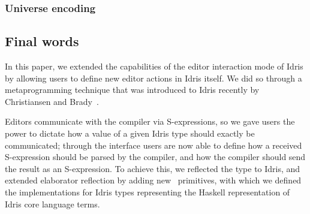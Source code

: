 



\subsubsection{Universe encoding}


\subsection{Final words}

In this paper, we extended the capabilities of the editor interaction mode of
Idris by allowing users to define new editor actions in Idris itself. We did
so through a metaprogramming technique that was introduced to Idris recently by
Christiansen and Brady~\cite{elabref}.

Editors communicate with the compiler via S-expressions, so we gave users the
power to dictate how a value of a given Idris type should exactly be
communicated; through the  interface users are now able to
define how a received S-expression should be parsed by the compiler, and how
the compiler should send the result as an S-expression. To achieve this, we
reflected the  type to Idris, and extended elaborator reflection
by adding new \Elab\ primitives, with which we defined the 
implementations for Idris types representing the Haskell representation of
Idris core language terms.

